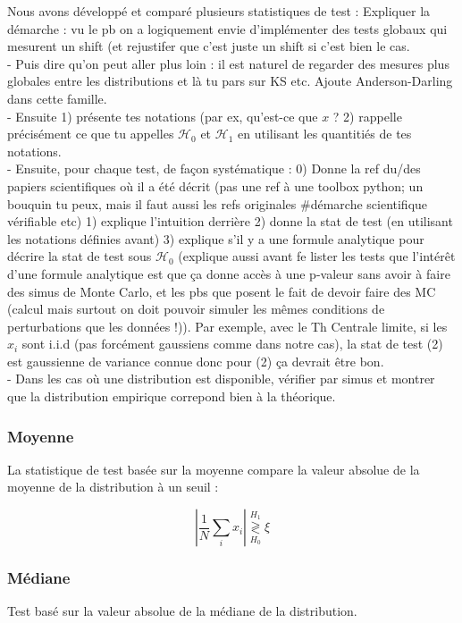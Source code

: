 \documentclass{article}
\newcommand{\dm}[1]{{\color{mulberry} #1}}
\begin{document}
Nous avons développé et comparé plusieurs statistiques de test :
\dm{Expliquer la démarche : vu le pb on a logiquement envie d'implémenter  des tests globaux qui mesurent un shift (et rejustifer que c'est juste un shift si c'est bien le cas.\\
- Puis dire qu'on peut aller plus loin : il est naturel de regarder des mesures plus globales entre les distributions et là tu pars sur  KS etc. Ajoute Anderson-Darling dans cette famille.\\
- Ensuite 1) présente tes notations (par ex, qu'est-ce que $x$ ? 2) rappelle précisément ce que tu appelles $\mathcal{H}_0$ et $\mathcal{H}_1$ en utilisant les quantitiés de  tes notations.\\
- Ensuite, pour chaque test, de façon systématique : 0) Donne la ref du/des papiers scientifiques où il a été décrit (pas une ref à une toolbox python; un bouquin tu peux, mais il faut aussi les refs originales \#démarche scientifique vérifiable etc) 1) explique l'intuition derrière 2) donne la stat de test (en utilisant les notations définies avant) 3) explique s'il y a une formule analytique pour décrire la stat de test sous $\mathcal{H}_0$ (explique aussi avant fe lister les tests  que l'intérêt d'une formule analytique est  que ça donne accès à une p-valeur sans avoir à faire des simus de Monte Carlo, et les pbs que posent le fait de devoir faire des MC (calcul mais surtout on doit pouvoir simuler les mêmes conditions de perturbations que les données !)). Par exemple, avec le Th Centrale limite, si les $x_i$ sont i.i.d (pas forcément gaussiens comme dans notre cas), la stat de test (2) est gaussienne de variance connue donc pour (2) ça devrait être bon.\\
- Dans les cas où une distribution est disponible, vérifier par simus et montrer que la distribution empirique correpond bien à la théorique. }
\subsubsection{Moyenne}

La statistique de test basée sur la moyenne compare la valeur absolue de la moyenne de la distribution à un seuil :

\begin{equation}
    \left|\frac{1}{N}\sum_i x_i \right| \stackrel{H_1}{\underset{H_0}{\gtrless}} \xi
\end{equation}

\subsubsection{Médiane}
Test basé sur la valeur absolue de la médiane de la distribution.
\end{document}
